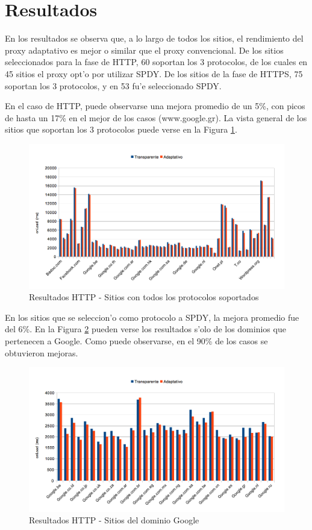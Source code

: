 \section{Resultados}

En los resultados se observa que, a lo largo de todos los sitios, el rendimiento del proxy adaptativo es mejor o similar que el proxy convencional. De los sitios seleccionados para la fase de HTTP, 60 soportan los 3 protocolos, de los cuales en 45 sitios el proxy opt'o por utilizar SPDY. De los sitios de la fase de HTTPS, 75 soportan los 3 protocolos, y en 53 fu'e seleccionado SPDY.

En el caso de HTTP, puede observarse una mejora promedio de un 5\%, con picos de hasta un 17\% en el mejor de los casos (www.google.gr). La vista general de los sitios que soportan los 3 protocolos puede verse en la Figura \ref{resGralHTTP}.

\begin{figure}[h!]
  	\centering
	\includegraphics[width=\textwidth]{img/resGralHTTP}
	\caption{\small Resultados HTTP - Sitios con todos los protocolos soportados}
	\label{resGralHTTP}
\end{figure}
\clearpage
En los sitios que se seleccion'o como protocolo a SPDY, la mejora promedio fue del 6\%. En la Figura \ref{resGoogleHTTP} pueden verse los resultados s'olo de los dominios que pertenecen a Google. Como puede observarse, en el 90\% de los casos se obtuvieron mejoras.
 
 \begin{figure}[h!]
  	\centering
	\includegraphics[width=\textwidth]{img/resGoogleHTTP}
	\caption{\small Resultados HTTP - Sitios del dominio Google}
	\label{resGoogleHTTP}
\end{figure}

